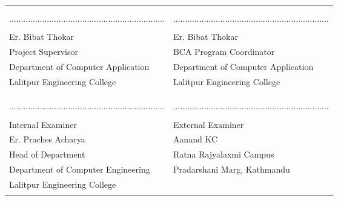 \begin{center}
    {\fontsize{14pt}{18}\selectfont
    \begin{table}[ht]
        \begin{tabularx}{\textwidth}{|Y|Y|}
        \hline
        &\\
        &\\
        ..................................................................&..................................................................\\
        &\\
        Er. Bibat Thokar & Er. Bibat Thokar \\
        Project Supervisor & BCA Program Coordinator \\
        Department of Computer Application & Department of Computer Application\\
        Lalitpur Engineering College & Lalitpur Engineering College \\
        &\\
        \hline
        &\\
        &\\
        ..................................................................&..................................................................\\
        &\\
        Internal Examiner & External Examiner \\
        Er. Praches Acharya & Aanand KC \\
        Head of Department & Ratna Rajyalaxmi Campus\\
        Department of Computer Engineering &Pradarshani Marg, Kathmandu \\
        Lalitpur Engineering College& \\
        &\\
        \hline
        \end{tabularx}
        \end{table}
    }
\end{center}